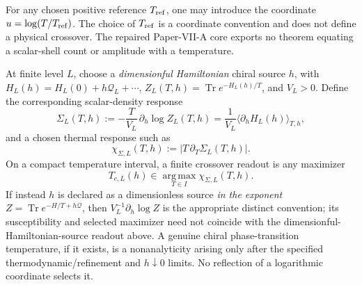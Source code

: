 \documentclass[12pt,a4paper]{article}
\begin{document}
\begin{definition}
\label{p11:def:native-scalar-shell-thermal-activation-scale}
For any chosen positive reference \(T_{\rm ref}\), one may introduce the coordinate \(u=\log(T/T_{\rm ref})\).  The choice of \(T_{\rm ref}\) is a coordinate convention and does not define a physical crossover.  The repaired Paper-VII-A core exports no theorem equating a scalar-shell count or amplitude with a temperature.
\end{definition}

\begin{definition}
\label{p11:def:native-thermal-crossover-readout}
At finite level \(L\), choose a \emph{dimensionful Hamiltonian} chiral source \(h\), with \(H_L(h)=H_L(0)+h\mathcal Q_L+\cdots\), \(Z_L(T,h)=\operatorname{Tr}e^{-H_L(h)/T}\), and \(V_L>0\). Define the corresponding scalar-density response
\[
\Sigma_L(T,h):=-\frac{T}{V_L}\,\partial_h\log Z_L(T,h)
=\frac1{V_L}\langle\partial_hH_L(h)\rangle_{T,h},
\]
and a chosen thermal response such as
\begin{equation}
\label{p11:eq:canonical-log-scalar-response}
\chi_{\Sigma,L}(T,h):=\left|T\,\partial_T\Sigma_L(T,h)\right|.
\end{equation}
On a compact temperature interval, a finite crossover readout is any maximizer
\begin{equation}
\label{p11:eq:canonical-native-crossover-selector}
T_{c,L}(h)\in\operatorname*{arg\,max}_{T\in I}\chi_{\Sigma,L}(T,h).
\end{equation}
\label{p11:eq:canonical-native-crossover-fixed-point}
If instead \(h\) is declared as a dimensionless source \emph{in the exponent} \(Z=\operatorname{Tr}e^{-H/T+h\mathcal Q}\), then \(V_L^{-1}\partial_h\log Z\) is the appropriate distinct convention; its susceptibility and selected maximizer need not coincide with the dimensionful-Hamiltonian-source readout above. A genuine chiral phase-transition temperature, if it exists, is a nonanalyticity arising only after the specified thermodynamic/refinement and \(h\downarrow0\) limits.  No reflection of a logarithmic coordinate selects it.
\end{definition}
\end{document}
